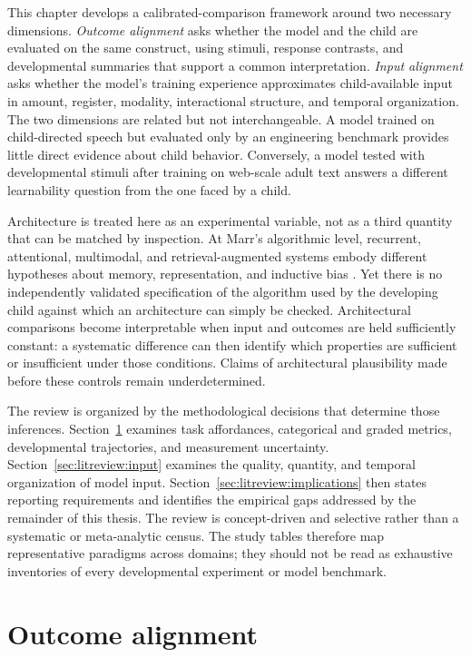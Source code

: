 This chapter develops a calibrated-comparison framework around two necessary dimensions. \emph{Outcome alignment} asks whether the model and the child are evaluated on the same construct, using stimuli, response contrasts, and developmental summaries that support a common interpretation. \emph{Input alignment} asks whether the model's training experience approximates child-available input in amount, register, modality, interactional structure, and temporal organization. The two dimensions are related but not interchangeable. A model trained on child-directed speech but evaluated only by an engineering benchmark provides little direct evidence about child behavior. Conversely, a model tested with developmental stimuli after training on web-scale adult text answers a different learnability question from the one faced by a child.

Architecture is treated here as an experimental variable, not as a third quantity that can be matched by inspection. At Marr's algorithmic level, recurrent, attentional, multimodal, and retrieval-augmented systems embody different hypotheses about memory, representation, and inductive bias \citep{Marr1982,Portelance2024}. Yet there is no independently validated specification of the algorithm used by the developing child against which an architecture can simply be checked. Architectural comparisons become interpretable when input and outcomes are held sufficiently constant: a systematic difference can then identify which properties are sufficient or insufficient under those conditions. Claims of architectural plausibility made before these controls remain underdetermined.

The review is organized by the methodological decisions that determine those inferences. Section~\ref{sec:litreview:outcome} examines task affordances, categorical and graded metrics, developmental trajectories, and measurement uncertainty. Section~\ref{sec:litreview:input} examines the quality, quantity, and temporal organization of model input. Section~\ref{sec:litreview:implications} then states reporting requirements and identifies the empirical gaps addressed by the remainder of this thesis. The review is concept-driven and selective rather than a systematic or meta-analytic census. The study tables therefore map representative paradigms across domains; they should not be read as exhaustive inventories of every developmental experiment or model benchmark.


\section{Outcome alignment}
\label{sec:litreview:outcome}

